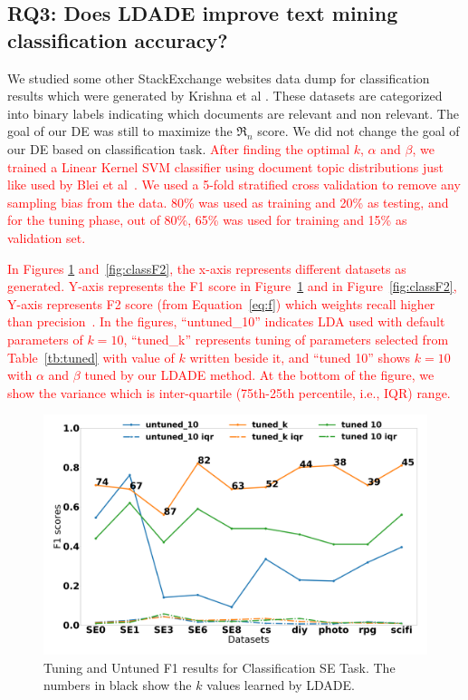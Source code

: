 \documentclass[twocolumn,5p,sort&compress]{elsarticle}
\newcommand{\eq}[1]{Equation~\ref{eq:#1}}
\theoremstyle{break}
\begin{document}
\subsection{\textbf{RQ3: Does LDADE improve text mining classification accuracy?}}\label{sect:rq3} 

We studied some other StackExchange websites data dump for classification results which were generated by Krishna et al \cite{krishna2016bigse}. These datasets are categorized into binary labels indicating which documents are relevant and non relevant. The goal of our DE was still to maximize the $\Re_n$ score. We did not change the goal of our DE based on classification task. \textcolor{red}{After finding the optimal $k$, $\alpha$ and $\beta$, we trained a Linear Kernel SVM classifier using document topic distributions just like used by Blei et al~\cite{blei2003latent}. We used a 5-fold stratified cross validation to remove any sampling bias from the data. 80\% was used as training and 20\% as testing, and for the tuning phase, out of 80\%, 65\% was used for training and 15\% as validation set.}

\textcolor{red}{In Figures \ref{fig:classF1} and~\ref{fig:classF2}, the x-axis represents different datasets as generated. Y-axis represents the F1 score in Figure~\ref{fig:classF1} and in Figure~\ref{fig:classF2}, Y-axis represents F2 score
(from \eq{f})  which weights recall higher than precision~\cite{powers2011evaluation}. In the figures, ``untuned\_10'' indicates LDA used with default parameters of $k=10$, ``tuned\_k'' represents tuning of parameters selected from Table~\ref{tb:tuned} with value of $k$ written beside it, and ``tuned 10'' shows $k=10$ with $\alpha$ and $\beta$ tuned by our LDADE method. At the bottom of the figure, we show the variance which is inter-quartile (75th-25th percentile, i.e., IQR) range.}

\begin{figure}[!htbp]
  \begin{center}
    \includegraphics[width=\linewidth]{./fig/F1_temp.png}
    \end{center}
  \caption{Tuning and Untuned F1 results for Classification SE Task. The numbers in black show the $k$ values
  learned by LDADE.}\label{fig:classF1}  
\end{figure}
\end{document}
